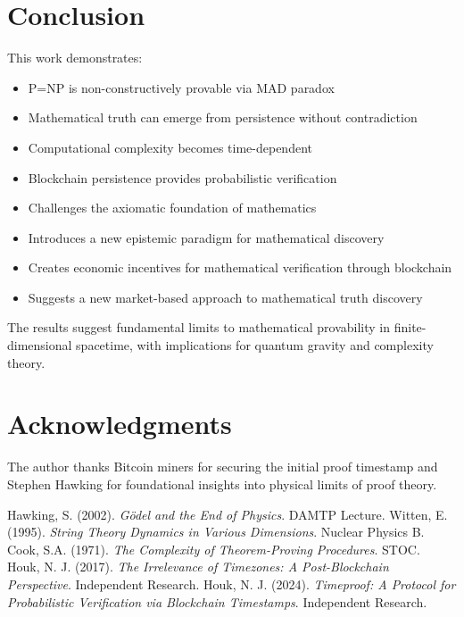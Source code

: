 \documentclass{article}
\begin{document}
\section{Conclusion}
This work demonstrates:
\begin{itemize}
    \item P=NP is non-constructively provable via MAD paradox
    \item Mathematical truth can emerge from persistence without contradiction
    \item Computational complexity becomes time-dependent
    \item Blockchain persistence provides probabilistic verification
    \item Challenges the axiomatic foundation of mathematics
    \item Introduces a new epistemic paradigm for mathematical discovery
    \item Creates economic incentives for mathematical verification through blockchain
    \item Suggests a new market-based approach to mathematical truth discovery
\end{itemize}

The results suggest fundamental limits to mathematical provability in finite-dimensional spacetime, with implications for quantum gravity and complexity theory.

\section*{Acknowledgments}
The author thanks Bitcoin miners for securing the initial proof timestamp and Stephen Hawking for foundational insights into physical limits of proof theory.

\begin{thebibliography}{9}
Hawking, S. (2002). \textit{Gödel and the End of Physics}. DAMTP Lecture.
Witten, E. (1995). \textit{String Theory Dynamics in Various Dimensions}. Nuclear Physics B.
Cook, S.A. (1971). \textit{The Complexity of Theorem-Proving Procedures}. STOC.
Houk, N. J. (2017). \textit{The Irrelevance of Timezones: A Post-Blockchain Perspective}. Independent Research.
Houk, N. J. (2024). \textit{Timeproof: A Protocol for Probabilistic Verification via Blockchain Timestamps}. Independent Research.
\end{thebibliography}
\end{document}
